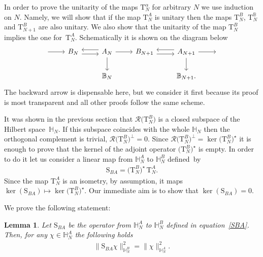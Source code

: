 \documentclass[pdftex]{sigma}%
\numberwithin{equation}{section}
\newtheorem{Lemma}[Theorem]{Lemma}
\begin{document}
In order to prove the unitarity of the maps $\mathrm T^\alpha_N$ for arbitrary $N$ we use induction on $N$. Namely, we will show
that if the map $\mathrm T_N^{A}$ is unitary %
then the maps $\mathrm T_N^B$, $\mathrm T_N^{\mathbb B}$ and $\mathrm T_{N+1}^B$ are also unitary. We also show that the unitarity of the
map $\mathrm T_{N}^B$ implies the one for~$\mathrm T_{N}^A$. Schematically it is shown on the diagram below
\begin{equation*}%
\begin{tikzcd}
\arrow[r] &B_N\arrow[r, yshift=-0.7ex]
&\arrow[l, yshift=0.7ex] A_N \arrow[r] \arrow[d] & B_{N+1}\arrow[r, yshift=-0.7ex] &
\arrow[l, yshift=0.7ex] A_{N+1} \arrow[d] \arrow[r] &{}
\\
&&\mathbb{B}_N && \mathbb{B}_{N+1}.
\end{tikzcd}
\end{equation*}
The backward arrow is dispensable here, but we consider it first because its proof is most transparent and all other proofs follow the same
scheme.

{\sloppy
It was shown in
the previous section that $\mathcal R\big(\mathrm T_N^B\big)$
is a closed subspace of the Hilbert space~$\mathbb H_N$. If this subspace coincides with the whole $\mathbb H_N$ then the orthogonal
complement is trivial, $\mathcal R\big(\mathrm T_N^B \big)^\perp=0$. Since $\mathcal R\big(\mathrm T_N^B \big)^\perp=\ker \big(\mathrm T_N^B\big)^\star$ it is
enough to prove that the kernel of the adjoint operator $\big(\mathrm T_N^B\big)^\star$ is empty. In order to do it let us consider a linear map
from $\mathbb H_N^A$ to $\mathbb H_N^B$ defined~by
\begin{gather}\label{SBA}
\mathrm S_{BA}=\big(\mathrm T_N^B\big)^\star\,\mathrm T_N^A.
\end{gather}
Since the map $\mathrm T_N^A$ is an isometry, by assumption, it maps $ \ker(\mathrm S_{BA})\mapsto \ker \big(\mathrm T_N^B\big)^\star$. Our
immediate aim is to show that $ \ker(\mathrm S_{BA})=0$.}

We prove the following statement:

\begin{Lemma}\label{lemma:SBA}
Let $\mathrm S_{BA}$ be the operator from $\mathbb H_{N}^A$ to $\mathbb H_N^B$ defined in equation~\eqref{SBA}. Then, for any $\chi\in \mathbb
H_{N}^A$ the following holds
\begin{gather}\label{id-SBA}
\|\mathrm S_{BA}\chi\|^2_{\mathbb H_N^B}=\|\chi\|^2_{\mathbb H_N^A}.
\end{gather}
\end{Lemma}
%
\end{document}
